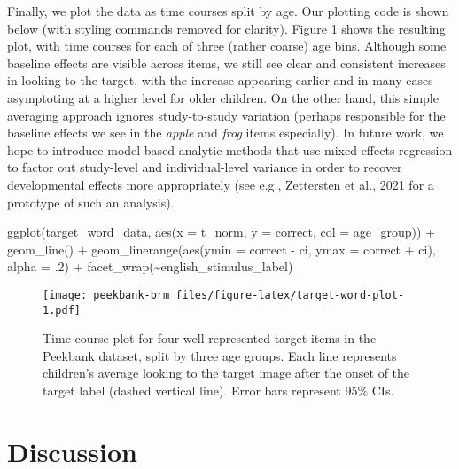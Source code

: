 \documentclass[
  english,
  man,floatsintext]{apa6}
\newenvironment{Shaded}{\begin{snugshade}}{\end{snugshade}}
\newcommand{\AttributeTok}[1]{\textcolor[rgb]{0.77,0.63,0.00}{#1}}
\newcommand{\DecValTok}[1]{\textcolor[rgb]{0.00,0.00,0.81}{#1}}
\newcommand{\FunctionTok}[1]{\textcolor[rgb]{0.00,0.00,0.00}{#1}}
\newcommand{\NormalTok}[1]{#1}
\newcommand{\SpecialCharTok}[1]{\textcolor[rgb]{0.00,0.00,0.00}{#1}}
\begin{document}
Finally, we plot the data as time courses split by age. Our plotting code is shown below (with styling commands removed for clarity). Figure \ref{fig:target-word-plot} shows the resulting plot, with time courses for each of three (rather coarse) age bins.
Although some baseline effects are visible across items, we still see clear and consistent increases in looking to the target, with the increase appearing earlier and in many cases asymptoting at a higher level for older children.
On the other hand, this simple averaging approach ignores study-to-study variation (perhaps responsible for the baseline effects we see in the \emph{apple} and \emph{frog} items especially).
In future work, we hope to introduce model-based analytic methods that use mixed effects regression to factor out study-level and individual-level variance in order to recover developmental effects more appropriately (see e.g., Zettersten et al., 2021 for a prototype of such an analysis).

\begin{Shaded}
\begin{Highlighting}[]
\FunctionTok{ggplot}\NormalTok{(target\_word\_data, }
       \FunctionTok{aes}\NormalTok{(}\AttributeTok{x =}\NormalTok{ t\_norm, }\AttributeTok{y =}\NormalTok{ correct, }\AttributeTok{col =}\NormalTok{ age\_group)) }\SpecialCharTok{+} 
  \FunctionTok{geom\_line}\NormalTok{() }\SpecialCharTok{+} 
  \FunctionTok{geom\_linerange}\NormalTok{(}\FunctionTok{aes}\NormalTok{(}\AttributeTok{ymin =}\NormalTok{ correct }\SpecialCharTok{{-}}\NormalTok{ ci, }\AttributeTok{ymax =}\NormalTok{ correct }\SpecialCharTok{+}\NormalTok{ ci), }
                 \AttributeTok{alpha =}\NormalTok{ .}\DecValTok{2}\NormalTok{) }\SpecialCharTok{+} 
  \FunctionTok{facet\_wrap}\NormalTok{(}\SpecialCharTok{\textasciitilde{}}\NormalTok{english\_stimulus\_label)}
\end{Highlighting}
\end{Shaded}

\begin{figure}
\centering
\texttt{[image: peekbank-brm\_files/figure-latex/target-word-plot-1.pdf]}
\caption{\label{fig:target-word-plot}Time course plot for four well-represented target items in the Peekbank dataset, split by three age groups. Each line represents children's average looking to the target image after the onset of the target label (dashed vertical line). Error bars represent 95\% CIs.}
\end{figure}

\hypertarget{discussion}{%
\section{Discussion}\label{discussion}}
\end{document}
